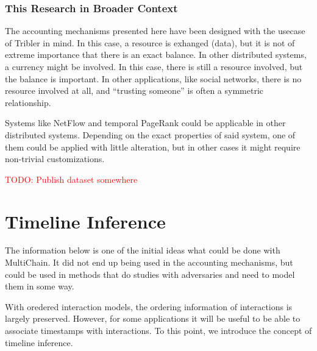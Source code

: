 \documentclass[a4paper,11pt]{book}
\newcommand\musthave[1]{\textcolor{red}{TODO: #1}}
\theoremstyle{definition}
\begin{document}
\subsection{This Research in Broader Context}
The accounting mechanisms presented here have been designed with the usecase of
Tribler in mind. In this case, a resource is exhanged (data), but it is not of extreme
importance that there is an exact balance. In other distributed systems, a currency
might be involved. In this case, there is still a resource involved, but the balance
is important. In other applications, like social networks, there is no resource involved
at all, and ``trusting someone'' is often a symmetric relationship. 

Systems like NetFlow and temporal PageRank could be applicable in other distributed
systems. Depending on the exact properties of said system, one of them could be
applied with little alteration, but in other cases it might require non-trivial
customizations.


\musthave{Publish dataset somewhere}










\appendix

\chapter{Timeline Inference}

The information below is one of the initial ideas what could be done with MultiChain. It did not end up being
used in the accounting mechanisms, but could be used in methods that do studies with adversaries and need
to model them in some way.
    
With oredered interaction models, the ordering information of interactions is largely preserved. However, for some
applications it will be useful to be able to associate timestamps with interactions. To
this point, we introduce the concept of timeline inference.
\end{document}

